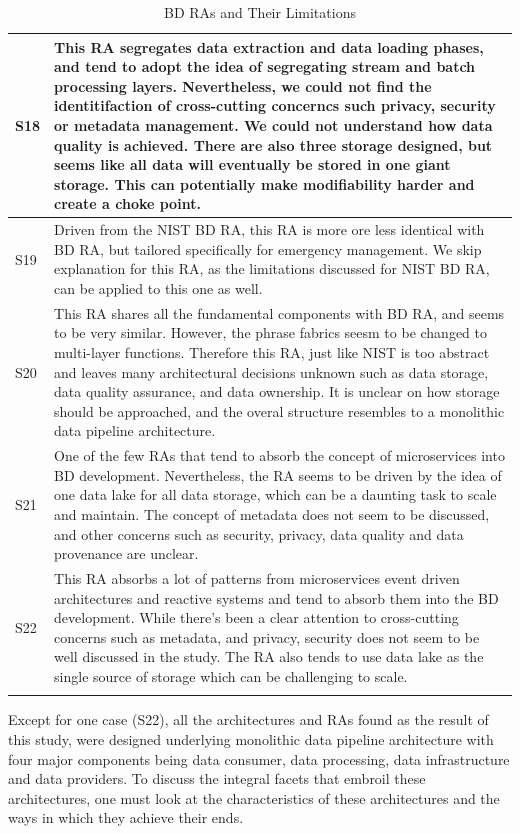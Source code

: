 \documentclass[review]{elsarticle}
\begin{document}
\begin{longtable}{|p{0.5cm}|p{11cm}|}
        \hline
        S18 & This RA segregates data extraction and data loading phases, and tend to adopt the idea of segregating stream and batch processing layers. Nevertheless, we could not find the identitifaction of cross-cutting concerncs such privacy, security or metadata management. We could not understand how data quality is achieved. There are also three storage designed, but seems like all data will eventually be stored in one giant storage. This can potentially make modifiability harder and create a choke point. \\
        \hline
        S19 & Driven from the NIST BD RA, this RA is more ore less identical with BD RA, but tailored specifically for emergency management. We skip explanation for this RA, as the limitations discussed for NIST BD RA, can be applied to this one as well. \\
        \hline
        S20 & This RA shares all the fundamental components with BD RA, and seems to be very similar. However, the phrase fabrics seesm to be changed to multi-layer functions. Therefore this RA, just like NIST is too abstract and leaves many architectural decisions unknown such as data storage, data quality assurance, and data ownership. It is unclear on how storage should be approached, and the overal structure resembles to a monolithic data pipeline architecture. \\
        \hline
        S21 & One of the few RAs that tend to absorb the concept of microservices into BD development. Nevertheless, the RA seems to be driven by the idea of one data lake for all data storage, which can be a daunting task to scale and maintain. The concept of metadata does not seem to be discussed, and other concerns such as security, privacy, data quality and data provenance are unclear.  \\
        \hline
        S22 & This RA absorbs a lot of patterns from microservices event driven architectures and reactive systems and tend to absorb them into the BD development. While there's been a clear attention to cross-cutting concerns such as metadata, and privacy, security does not seem to be well discussed in the study. The RA also tends to use data lake as the single source of storage which can be challenging to scale.  \\
        \hline
        \caption{BD RAs and Their Limitations}
        \label{table:BD-RAs-Limitations}
\end{longtable}

Except for one case (S22), all the architectures and RAs found as the result of this study, were designed underlying monolithic data pipeline architecture with four major components being data consumer, data processing, data infrastructure and data providers. To discuss the integral facets that embroil these architectures, one must
look at the characteristics of these architectures and the ways in which they achieve their ends.
\end{document}
